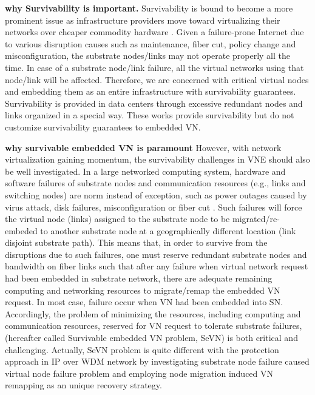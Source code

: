 \textbf{why Survivability is important. }Survivability is bound to become a more prominent issue as infrastructure providers move toward virtualizing their networks over cheaper commodity hardware \cite{bhatia2008trellis}. Given a failure-prone Internet due to various disruption causes such as maintenance, fiber cut, policy change and misconfiguration, the substrate nodes/links may not operate properly all the time. In case of a substrate node/link failure, all the virtual networks using that node/link will be affected. Therefore, we are concerned with critical virtual nodes and embedding them as an entire infrastructure with survivability guarantees. Survivability is provided in data centers \cite{guo2009bcube} through excessive redundant nodes and links organized in a special way. These works provide survivability but do not customize survivability guarantees to embedded VN.

\textbf{why survivable embedded VN is paramount} However, with network virtualization gaining momentum, the survivability challenges in VNE should also be well investigated\cite{herker2013survey}. In a large networked computing system, hardware and software failures of substrate nodes and communication resources (e.g., links and switching nodes) are norm instead of exception, such as power outages caused by virus attack, disk failures, misconfiguration or fiber cut \cite{xu2012survivable,rahman2010survivable,rahman2013svne,guo2011shared,chen2010resilient}. Such failures will force the virtual node (links) assigned to the substrate node to be migrated/re-embeded to another substrate node at a geographically different location (link disjoint substrate path). This means that, in order to survive from the disruptions due to such failures, one must reserve redundant substrate nodes and bandwidth on fiber links such that after any failure when virtual network request had been embedded in substrate network, there are adequate remaining computing and networking resources to migrate/remap the embedded VN request. In most case, failure occur when VN had been embedded into SN. Accordingly, the problem of minimizing the resources, including computing and communication resources, reserved for VN request to tolerate substrate failures, (hereafter called Survivable embedded VN problem, SeVN) is both critical and challenging. Actually, SeVN problem is quite different with the protection approach
in IP over WDM network by investigating substrate node failure caused virtual node failure problem and employing node migration induced VN remapping as an unique recovery strategy.


